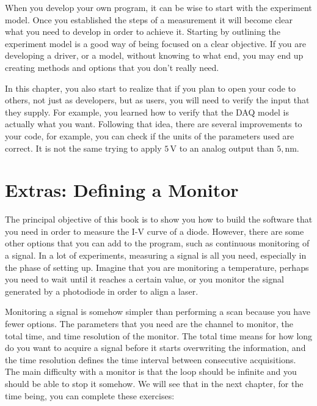 When you develop your own program, it can be wise to start with the experiment model. Once you established the steps of a measurement it will become clear what you need to develop in order to achieve it. Starting by outlining the experiment model is a good way of being focused on a clear objective. If you are developing a driver, or a model, without knowing to what end, you may end up creating methods and options that you don't really need.

In this chapter, you also start to realize that if you plan to open your code to others, not just as developers, but as users, you will need to verify the input that they supply. For example, you learned how to verify that the {DAQ} model is actually what you want. Following that idea, there are several improvements to your code, for example, you can check if the units of the parameters used are correct. It is not the same trying to apply $5\,\textrm{V}$ to an analog output than $5,\textrm{nm}$. 

\section{Extras: Defining a Monitor}\label{extras-defining-amonitor}
The principal objective of this book is to show you how to build the software that you need in order to measure the I-V curve of a diode. However, there are some other options that you can add to the program, such as continuous monitoring of a signal. In a lot of experiments, measuring a signal is all you need, especially in the phase of setting up. Imagine that you are monitoring a temperature, perhaps you need to wait until it reaches a certain value, or you monitor the signal generated by a photodiode in order to align a laser.

Monitoring a signal is somehow simpler than performing a scan because you have fewer options. The parameters that you need are the channel to monitor, the total time, and time resolution of the monitor. The total time means for how long do you want to acquire a signal before it starts overwriting the information, and the time resolution defines the time interval between consecutive acquisitions. The main difficulty with a monitor is that the loop should be infinite and you should be able to stop it somehow. We will see that in the next chapter, for the time
being, you can complete these exercises:


